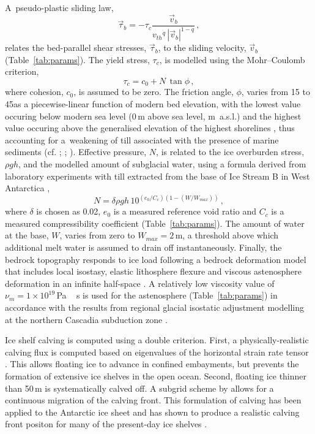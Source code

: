 \documentclass[tc, manuscript]{copernicus}
\begin{document}
A~pseudo-plastic sliding law,
\begin{equation}
    \label{eqn:pseudoplastic}
    \vec{\tau}_b = -\tau_c \frac{\vec{v}_b}{{v_{th}}^q\,|\vec{v}_b|^{1-q}} \,,
\end{equation}
relates the bed-parallel shear stresses, $\vec{\tau}_b$, to the sliding
velocity, $\vec{v}_b$ (Table~\ref{tab:params}).
The yield stress, $\tau_c$,
is modelled using the Mohr--Coulomb criterion,
\begin{equation}
   \tau_c = c_0 + N\,\tan{\phi} \,,
\end{equation}
where cohesion, $c_0$, is assumed to be zero. The friction angle, $\phi$,
varies from 15 to 45\degree as a piecewise-linear function of modern bed
elevation, with the lowest value occuring below modern sea level (0\,m above
sea level, m~a.s.l.) and the highest value occuring above the generalised
elevation of the highest shorelines
\citep[200\,m~a.s.l.,][Fig.~5]{Clague.1981}, thus accounting for
a~weakening of till associated with the presence of marine sediments
(cf. \citealp{Martin.etal.2011}; \citealp[supplement]{Aschwanden.etal.2013};
\citealp{PISM-authors.2015}). Effective pressure, $N$,
is related to the ice overburden stress, $\rho gh$, and the modelled amount of
subglacial water, using a formula derived from laboratory experiments with till
extracted from the base of Ice Stream B in West Antarctica
\citep{Tulaczyk.etal.2000, Bueler.Pelt.2015},
\begin{equation}
    N = \delta \rho gh \, 10^{(e_0/C_c) (1 - (W/W_{max}))} \,,
\end{equation}
where $\delta$ is chosen as 0.02, $e_0$ is a measured reference void ratio and
$C_c$ is a measured compressibility coefficient (Table~\ref{tab:params}). The
amount of water at the base, $W$, varies from zero to $W_{max}=2$\,m, a
threshold above which additional melt water is assumed to drain off
instantaneously. Finally, the bedrock topography responds to ice load
following a bedrock deformation model that includes local isostasy,
elastic lithosphere flexure and viscous astenosphere deformation in an infinite
half-space \citep{Lingle.Clark.1985,Bueler.etal.2007}.
A relatively low viscosity value of $\nu_m = 1\times10^{19}$\,\unit{Pa\,s} is
used for the astenosphere (Table~\ref{tab:params}) in accordance with the
results from regional glacial
isostatic adjustment modelling at the northern Cascadia subduction zone
\citep{James.etal.2009}.

Ice shelf calving is computed using a double criterion. First, a
physically-realistic calving flux is computed based on eigenvalues of the
horizontal strain rate tensor \citep{Winkelmann.etal.2011,
Levermann.etal.2012}. This allows floating ice to advance in confined
embayments, but prevents the formation of extensive ice shelves in the open ocean.
Second, floating ice thinner than 50\,m is systematically calved off. A subgrid
scheme by \citet{Albrecht.etal.2011} allows for a continuous migration of the
calving front. This formulation of calving has been applied to the Antarctic ice
sheet and has shown to produce a realistic calving front positon for many of
the present-day ice shelves \citep{Martin.etal.2011}.
\end{document}

